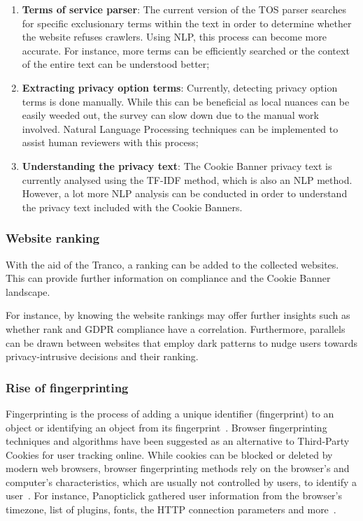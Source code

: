 \documentclass[../main.tex]{subfiles}
\begin{document}
\begin{enumerate}
    \item \textbf{Terms of service parser}: The current version of the TOS parser searches for specific exclusionary terms within the text in order to determine whether the website refuses crawlers. Using NLP, this process can become more accurate. For instance, more terms can be efficiently searched or the context of the entire text can be understood better;

    \item \textbf{Extracting privacy option terms}: Currently, detecting privacy option terms is done manually. While this can be beneficial as local nuances can be easily weeded out, the survey can slow down due to the manual work involved. Natural Language Processing techniques can be implemented to assist human reviewers with this process;

    \item \textbf{Understanding the privacy text}: The Cookie Banner privacy text is currently analysed using the TF-IDF method, which is also an NLP method. However, a lot more NLP analysis can be conducted in order to understand the privacy text included with the Cookie Banners. 
\end{enumerate}

\subsubsection{Website ranking}
With the aid of the Tranco, a ranking can be added to the collected websites. This can provide further information on compliance and the Cookie Banner landscape.

For instance, by knowing the website rankings may offer further insights such as whether rank and GDPR compliance have a correlation. Furthermore, parallels can be drawn between websites that employ dark patterns to nudge users towards privacy-intrusive decisions and their ranking.

\subsubsection{Rise of fingerprinting}
Fingerprinting is the process of adding a unique identifier (fingerprint) to an object or identifying an object from its fingerprint~\cite{wagner1983fingerprinting}. Browser fingerprinting techniques and algorithms have been suggested as an alternative to Third-Party Cookies for user tracking online. While cookies can be blocked or deleted by modern web browsers, browser fingerprinting methods rely on the browser’s and computer’s characteristics, which are usually not controlled by users, to identify a user~\cite{boda2011user}. For instance, Panopticlick gathered user information from the browser’s timezone, list of plugins, fonts, the HTTP connection parameters and more~\cite{eckersley2010unique}.
\end{document}
